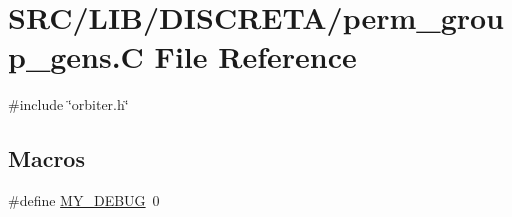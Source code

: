 \hypertarget{perm__group__gens_8_c}{}\section{S\+R\+C/\+L\+I\+B/\+D\+I\+S\+C\+R\+E\+T\+A/perm\+\_\+group\+\_\+gens.C File Reference}
\label{perm__group__gens_8_c}
{\ttfamily \#include \char`\"{}orbiter.\+h\char`\"{}}\newline
\subsection*{Macros}
\begin{DoxyCompactItemize}
\item 
\#define \mbox{\hyperlink{perm__group__gens_8_c_a7e7232f278193dd8684f973ee70ef3f5}{M\+Y\+\_\+\+D\+E\+B\+UG}}~0
\end{DoxyCompactItemize}
